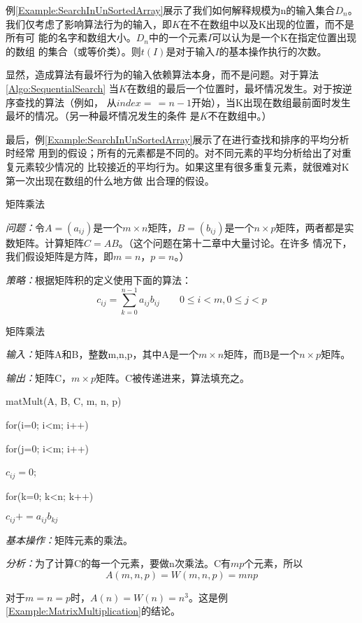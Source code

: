 例\ref{Example:SearchInUnSortedArray}展示了我们如何解释规模为n的输入集合$D_n$。
我们仅考虑了影响算法行为的输入，即$K$在不在数组中以及K出现的位置，而不是所有可
能的名字和数组大小。$D_n$中的一个元素$I$可以认为是一个K在指定位置出现的数组
的集合（或等价类）。则$t(I)$是对于输入$I$的基本操作执行的次数。

显然，造成算法有最坏行为的输入依赖算法本身，而不是问题。对于算法\ref{Algo:SequentialSearch}
当$K$在数组的最后一个位置时，最坏情况发生。对于按逆序查找的算法（例如，
从$index=\,=n-1$开始），当K出现在数组最前面时发生最坏的情况。（另一种最坏情况发生的条件
是$K$不在数组中。）

最后，例\ref{Example:SearchInUnSortedArray}展示了在进行查找和排序的平均分析时经常
用到的假设；所有的元素都是不同的。对不同元素的平均分析给出了对重复元素较少情况的
比较接近的平均行为。如果这里有很多重复元素，就很难对K第一次出现在数组的什么地方做
出合理的假设。

\begin{example}\label{Example:MatrixMultiplication}
矩阵乘法

\emph{问题：}令$A=(a_{ij})$是一个$m\times
n$矩阵，$B=(b_{ij})$是一个$n\times
p$矩阵，两者都是实数矩阵。计算矩阵$C=AB$。（这个问题在第十二章中大量讨论。在许多
情况下，我们假设矩阵是方阵，即$m=n$，$p=n$。）

\emph{策略：}根据矩阵积的定义使用下面的算法：
\begin{displaymath}
    c_{ij}=\sum_{k=0}^{n-1}a_{ij}b_{ij} \qquad 0\leq i<m , 0\leq
    j<p
\end{displaymath}

\end{example}

\begin{algorithm}\label{Algo:MatrixMultiplication}
矩阵乘法

\emph{输入：}矩阵A和B，整数m,n,p，其中A是一个$m\times
n$矩阵，而B是一个$n\times p$矩阵。

\emph{输出：}矩阵C，$m\times p$矩阵。C被传递进来，算法填充之。

matMult(A, B, C, m, n, p)

\hspace{2ex}for(i=0; i<m; i++)

\hspace{4ex}for(j=0; i<m; i++)

\hspace{6ex}$c_{ij} = 0$;

\hspace{6ex}for(k=0; k<n; k++)

\hspace{8ex}$c_{ij}+=a_{ij}b_{kj}$


\emph{基本操作：}矩阵元素的乘法。

\emph{分析：}为了计算C的每一个元素，要做n次乘法。C有$mp$个元素，所以
\begin{displaymath}
    A(m, n, p)= W(m, n, p) = mnp
\end{displaymath}

对于$m=n=p$时，$A(n)=W(n)=n^3$。这是例\ref{Example:MatrixMultiplication}的结论。


\end{algorithm}

